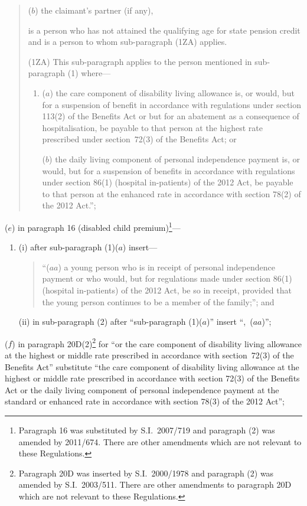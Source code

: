\documentclass[12pt,a4paper]{article}
\begin{document}
\begin{enumerate}
\begin{quotation}
\begin{enumerate}
($b$) the claimant’s partner (if any),
\end{enumerate}
is a person who has not attained the qualifying age for state pension credit and is a person to whom sub-paragraph (1ZA) applies.

(1ZA) This sub-paragraph applies to the person mentioned in sub-paragraph (1) where—
\begin{enumerate}\item[]
($a$) the care component of disability living allowance is, or would, but for a suspension of benefit in accordance with regulations under section 113(2) of the Benefits Act or but for an abatement as a consequence of hospitalisation, be payable to that person at the highest rate prescribed under section~72(3) of the Benefits Act; or

($b$) the daily living component of personal independence payment is, or would, but for a suspension of benefits in accordance with regulations under section 86(1) (hospital in-patients) of the 2012 Act, be payable to that person at the enhanced rate in accordance with section 78(2) of the 2012 Act.”;
\end{enumerate}
\end{quotation}

($e$) in paragraph 16 (disabled child premium)\footnote{Paragraph 16 was substituted by S.I.~2007/719 and paragraph (2) was amended by 2011/674. There are other amendments which are not relevant to these Regulations.}—
\begin{enumerate}\item[]
(i) after sub-paragraph (1)($a$)  insert—
\begin{quotation}
“($aa$) a young person who is in receipt of personal independence payment or who would, but for regulations made under section 86(1) (hospital in-patients) of the 2012 Act, be so in receipt, provided that the young person continues to be a member of the family;”; and
\end{quotation}

(ii) in sub-paragraph (2) after “sub-paragraph (1)($a$)” insert “,~($aa$)”;
\end{enumerate}

($f$) in paragraph 20D(2)\footnote{Paragraph 20D was inserted by S.I.~2000/1978 and paragraph (2) was amended by S.I.~2003/511. There are other amendments to paragraph 20D which are not relevant to these Regulations.} for “or the care component of disability living allowance at the highest or middle rate prescribed in accordance with section~72(3) of the Benefits Act” substitute “the care component of disability living allowance at the highest or middle rate prescribed in accordance with section 72(3) of the Benefits Act or the daily living component of personal independence payment at the standard or enhanced rate in accordance with section 78(3) of the 2012 Act”;


\end{enumerate}
\end{document}
